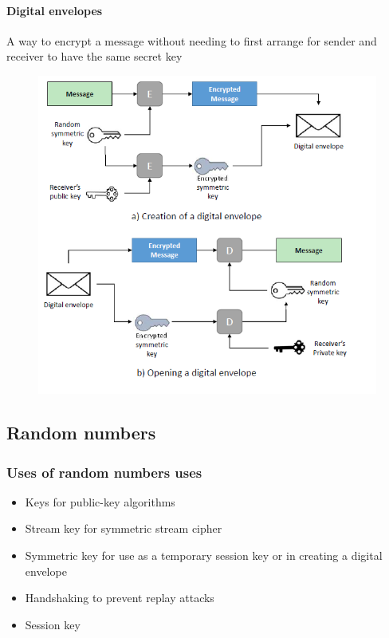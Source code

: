 \documentclass{article}
\begin{document}
                             \paragraph{Digital envelopes}
                            A way to encrypt a message without
                            needing to first arrange for sender and
                            receiver to have the same secret key
                            \begin{figure}[h]
                                \begin{center}
                                    \includegraphics[scale=0.8]{../immagini/digital_envelope.png}
                                \end{center}
                                \caption{}
                            \end{figure}
        \newpage
        \subsection{Random numbers}
                            \subsubsection{Uses of
                            random
                            numbers uses}
                            \begin{itemize}
                                \item Keys for public-key algorithms
                                \item Stream key for symmetric stream cipher
                                \item Symmetric key for use as a temporary session key or in creating a digital envelope
                                \item Handshaking to prevent replay attacks
                                \item Session key
                            \end{itemize}
\end{document}

